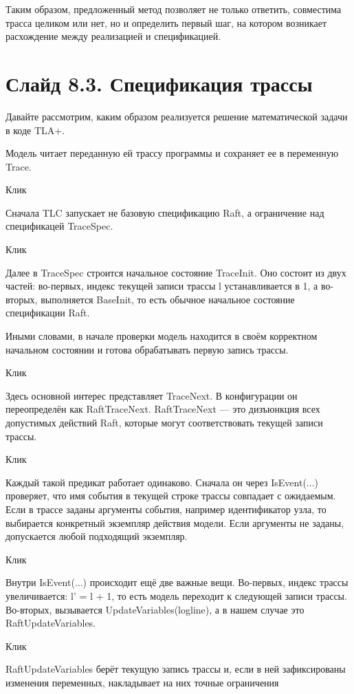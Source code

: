 \documentclass[12pt,a4paper]{article}
\begin{document}
Таким образом, предложенный метод позволяет не только ответить,
совместима трасса целиком или нет, но и определить первый шаг, на
котором возникает расхождение между реализацией и спецификацией.

\section*{Слайд 8.3. Спецификация трассы}

Давайте рассмотрим, каким образом реализуется решение математической задачи в
коде TLA+.

Модель читает переданную ей трассу программы и сохраняет ее в переменную Trace.

Клик

Сначала TLC запускает не базовую спецификацию Raft, а ограничение над
спецификацей TraceSpec.

Клик

Далее в TraceSpec строится начальное состояние TraceInit.
Оно состоит из двух частей:
во-первых, индекс текущей записи трассы l устанавливается в 1,
а во-вторых, выполняется BaseInit, то есть обычное начальное
состояние спецификации Raft.

Иными словами, в начале проверки модель находится в своём
корректном начальном состоянии и готова обрабатывать первую
запись трассы.

Клик

Здесь основной интерес представляет TraceNext.
В конфигурации он переопределён как RaftTraceNext.
RaftTraceNext — это дизъюнкция всех допустимых действий Raft,
которые могут соответствовать текущей записи трассы.

Клик

Каждый такой предикат работает одинаково.
Сначала он через IsEvent(...) проверяет, что имя события в
текущей строке трассы совпадает с ожидаемым.
Если в трассе заданы аргументы события, например идентификатор
узла, то выбирается конкретный экземпляр действия модели.
Если аргументы не заданы, допускается любой подходящий экземпляр.

Клик

Внутри IsEvent(...) происходит ещё две важные вещи.
Во-первых, индекс трассы увеличивается: l' = l + 1,
то есть модель переходит к следующей записи трассы.
Во-вторых, вызывается UpdateVariables(logline), а в нашем случае
это RaftUpdateVariables.

Клик

RaftUpdateVariables берёт текущую запись трассы и, если в ней
зафиксированы изменения переменных, накладывает на них точные
ограничения
\end{document}
